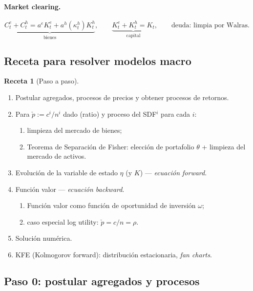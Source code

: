 \documentclass[11pt]{article}
\theoremstyle{definition}
\newtheorem{receta}{Receta}[section]
\theoremstyle{remark}
\newcommand{\aE}{a^{e}}
\newcommand{\aH}{a^{h}}
\begin{document}
\paragraph{Market clearing.}
\begin{equation}
\underbrace{C_t^{e}+C_t^{h}=\aE K_t^{e}+\aH(\kappa_t^{h})K_t^{h}}_{\text{bienes}},\qquad
\underbrace{K_t^{e}+K_t^{h}=K_t}_{\text{capital}},\qquad
\text{deuda: limpia por Walras.}
\end{equation}

\subsection{Receta para resolver modelos macro}

\begin{receta}[Paso a paso]
\begin{enumerate}[label=\textbf{\arabic*.},leftmargin=2.4em]
\item[\textbf{0.}] Postular agregados, procesos de precios y obtener procesos de retornos.
\item Para $\check p:=c^{i}/n^{i}$ dado (ratio) y proceso del SDF$^{i}$ para cada $i$:
  \begin{enumerate}[label=(\alph*)]
  \item limpieza del mercado de bienes;
  \item Teorema de Separación de Fisher: elección de portafolio $\theta$ + limpieza del mercado de activos.
  \end{enumerate}
\item Evolución de la variable de estado $\eta$ (y $K$) — \emph{ecuación forward}.
\item Función valor — \emph{ecuación backward}.
  \begin{enumerate}[label=(\alph*)]
  \item Función valor como función de oportunidad de inversión $\omega$;
  \item caso especial log utility: $\check p=c/n=\rho$.
  \end{enumerate}
\item Solución numérica.
\item KFE (Kolmogorov forward): distribución estacionaria, \emph{fan charts}.
\end{enumerate}
\end{receta}

\subsection{Paso 0: postular agregados y procesos}
\end{document}
